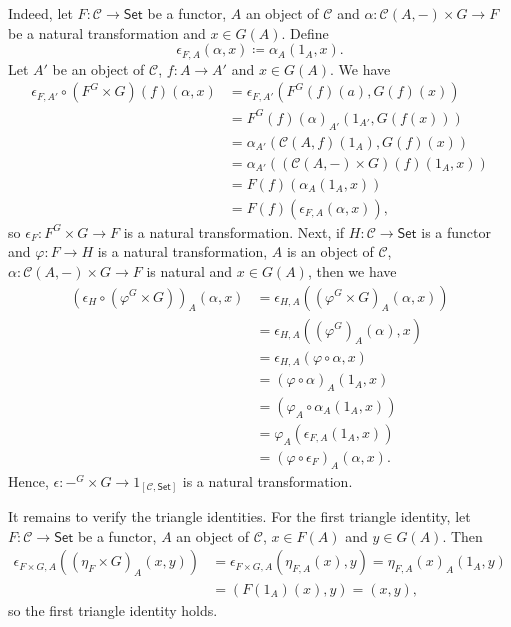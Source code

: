 Indeed, let $F\colon \mathcal{C}\to\mathsf{Set}$ be a functor, $A$ an object of
$\mathcal{C}$ and $\alpha\colon \mathcal{C}(A, {-})\times G\to F$ be a natural
transformation and $x \in G(A)$. Define
\[ \epsilon_{F, A}(\alpha, x)\coloneqq \alpha_A(1_A, x). \]
Let $A'$ be an object of $\mathcal{C}$, $f\colon A\to A'$ and $x \in G(A)$. We
have
\begin{align*}
	\epsilon_{F, A'} \circ(F^G\times G)(f)(\alpha, x)
	&= \epsilon_{F, A'}(F^G(f)(a), G(f)(x))\\
	&= F^G(f)(\alpha)_{A'}(1_{A'}, G(f(x)))\\
	&= \alpha_{A'}(\mathcal{C}(A, f)(1_A), G(f)(x))\\
	&= \alpha_{A'}((\mathcal{C}(A, {-})\times G)(f)(1_A, x))\\
	&= F(f)(\alpha_A(1_A, x))\\
	&= F(f)(\epsilon_{F, A}(\alpha, x)),
\end{align*}
so $\epsilon_F\colon F^G\times G\to F$ is a natural transformation. Next,
if $H\colon \mathcal{C}\to \mathsf{Set}$ is a functor and
$\varphi\colon F\to H$ is a natural transformation, $A$ is an object of $\mathcal{C}$,
$\alpha\colon \mathcal{C}(A, {-})\times G\to F$ is natural and $x \in G(A)$, then
we have
\begin{align*}
	(\epsilon_H \circ (\varphi^G\times G))_A(\alpha, x)
	&= \epsilon_{H, A}((\varphi^G\times G)_A(\alpha, x))\\
	&= \epsilon_{H, A}((\varphi^G)_A(\alpha), x)\\
	&= \epsilon_{H, A}(\varphi \circ\alpha, x)\\
	&= (\varphi \circ\alpha)_A(1_A, x)\\
	&= (\varphi_A \circ\alpha_A(1_A, x))\\
	&= \varphi_A(\epsilon_{F, A}(1_A, x))\\
	&= (\varphi \circ\epsilon_F)_A(\alpha, x).
\end{align*}
Hence, $\epsilon\colon {-}^G\times G\to 1_{[\mathcal{C}, \mathsf{Set}]}$
is a natural transformation.

It remains to verify the triangle identities.
For the first triangle identity, let $F\colon \mathcal{C} \to \mathsf{Set}$ be
a functor, $A$ an object of $\mathcal{C}$, $x \in F(A)$ and $y \in G(A)$. Then
\begin{align*}
	\epsilon_{F\times G, A}((\eta_F\times G)_A(x, y)) &= \epsilon_{F\times G, A}(\eta_{F, A}(x), y) = \eta_{F, A}(x)_A(1_A, y)\\
	&= (F(1_A)(x), y) = (x, y),
\end{align*}
so the first triangle identity holds.

